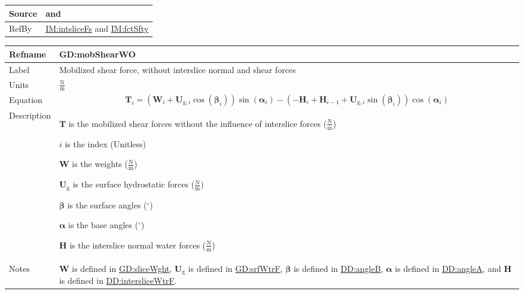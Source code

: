 \documentclass[12pt]{article}
\begin{document}
\begin{minipage}{\textwidth}
\begin{tabular}{>{\raggedright}p{}>{\raggedright\arraybackslash}p{}}
\\ \midrule
Source & \cite{chen2005} and \cite{karchewski2012}
         
\\ \midrule
RefBy & \hyperref[IM:intsliceFs]{IM:intsliceFs} and \hyperref[IM:fctSfty]{IM:fctSfty}
        
\\ \bottomrule
\end{tabular}
\end{minipage}

\medskip
\noindent
\begin{minipage}{\textwidth}
\begin{tabular}{>{\raggedright}p{}>{\raggedright\arraybackslash}p{}}
\toprule \textbf{Refname} & \textbf{GD:mobShearWO}
\label{GD:mobShearWO}
\\ \midrule
Label & Mobilized shear force, without interslice normal and shear forces
        
\\ \midrule
Units & $\frac{\text{N}}{\text{m}}$
        
\\ \midrule
Equation & \begin{displaymath}
           {\symbf{T}}_{i}=\left({\symbf{W}}_{i}+{\symbf{U}_{\text{g},i}} \cos\left({\symbf{β}}_{i}\right)\right) \sin\left({\symbf{α}}_{i}\right)-\left(-{\symbf{H}}_{i}+{\symbf{H}}_{i-1}+{\symbf{U}_{\text{g},i}} \sin\left({\symbf{β}}_{i}\right)\right) \cos\left({\symbf{α}}_{i}\right)
           \end{displaymath}
\\ \midrule
Description & \begin{symbDescription}
              \item{$\symbf{T}$ is the mobilized shear forces without the influence of interslice forces ($\frac{\text{N}}{\text{m}}$)}
              \item{$i$ is the index (Unitless)}
              \item{$\symbf{W}$ is the weights ($\frac{\text{N}}{\text{m}}$)}
              \item{${\symbf{U}_{\text{g}}}$ is the surface hydrostatic forces ($\frac{\text{N}}{\text{m}}$)}
              \item{$\symbf{β}$ is the surface angles (${{}^{\circ}}$)}
              \item{$\symbf{α}$ is the base angles (${{}^{\circ}}$)}
              \item{$\symbf{H}$ is the interslice normal water forces ($\frac{\text{N}}{\text{m}}$)}
              \end{symbDescription}
\\ \midrule
Notes & $\symbf{W}$ is defined in \hyperref[GD:sliceWght]{GD:sliceWght}, ${\symbf{U}_{\text{g}}}$ is defined in \hyperref[GD:srfWtrF]{GD:srfWtrF}, $\symbf{β}$ is defined in \hyperref[DD:angleB]{DD:angleB}, $\symbf{α}$ is defined in \hyperref[DD:angleA]{DD:angleA}, and $\symbf{H}$ is defined in \hyperref[DD:intersliceWtrF]{DD:intersliceWtrF}.
        

\end{tabular}
\end{minipage}
\end{document}
